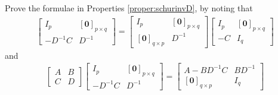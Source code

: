 \begin{Exercise}
\label{ex:schurinvD}
Prove the formulae in Properties \ref{proper:schurinvD}, by noting that
\begin{align*}
\begin{bmatrix}
I_p & [\textbf{0}]_{p \times q} \\
-D^{-1}C & D^{-1}
\end{bmatrix}  
=
\begin{bmatrix}
I_p & [\textbf{0}]_{p \times q} \\
[\textbf{0}]_{q \times p} & D^{-1}
\end{bmatrix} 
\begin{bmatrix}
I_p & [\textbf{0}]_{p \times q} \\
-C & I_q
\end{bmatrix} 
\end{align*}
and
\begin{align*}
\begin{bmatrix}
A & B \\
C & D
\end{bmatrix}
\begin{bmatrix}
I_p & [\textbf{0}]_{p \times q} \\
-D^{-1}C & D^{-1}
\end{bmatrix} =
\begin{bmatrix}
A - BD^{-1}C & BD^{-1} \\
[\textbf{0}]_{q \times p} & I_q
\end{bmatrix}
\end{align*}
\end{Exercise}
